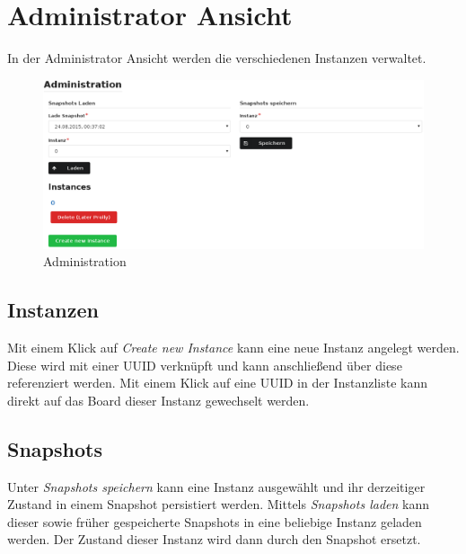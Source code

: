 \section{Administrator Ansicht}
\label{sec:admin-ansicht}
In der Administrator Ansicht werden die verschiedenen
Instanzen verwaltet.
\begin{figure}[ht]
  \centering
  \includegraphics[width=\textwidth]{fig/admin.png}
  \caption{Administration}
\end{figure}

\subsection*{Instanzen}
\label{sec:instanzen}
 Mit einem Klick auf \emph{Create new Instance} kann eine
neue Instanz angelegt werden. Diese wird mit einer UUID verknüpft und kann
anschließend über diese referenziert werden. Mit einem Klick auf eine UUID in
der Instanzliste kann direkt auf das Board dieser Instanz gewechselt werden.

\subsection*{Snapshots}
\label{sec:snapshots}
Unter \emph{Snapshots speichern} kann eine Instanz ausgewählt und ihr
derzeitiger Zustand in einem Snapshot persistiert werden.
Mittels \emph{Snapshots laden} kann dieser sowie früher gespeicherte Snapshots
in eine beliebige Instanz geladen werden. Der Zustand dieser Instanz wird dann
durch den Snapshot ersetzt.

